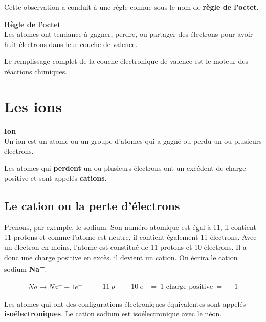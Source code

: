 \documentclass[
  11pt,
  french,
  a4paper,
  openany]{book}
\begin{document}
Cette observation a conduit à une règle connue sous le nom de \textbf{règle de l'octet}.

\begin{tcolorbox}
\textbf{Règle de l'octet}\\
Les atomes ont tendance à gagner, perdre, ou partager des électrons pour avoir huit électrons dans leur couche de valence.

\end{tcolorbox}

Le remplissage complet de la couche électronique de valence est le moteur des réactions chimiques.

\hypertarget{les-ions}{%
\section{Les ions}\label{les-ions}}

\begin{tcolorbox}
\textbf{Ion}\\
Un ion est un atome ou un groupe d'atomes qui a gagné ou perdu un ou plusieurs électrons.

\end{tcolorbox}

Les atomes qui \textbf{perdent} un ou plusieurs électrons ont un excédent de charge positive et sont appelés \textbf{cations}.

\hypertarget{le-cation-ou-la-perte-duxe9lectrons}{%
\subsection{Le cation ou la perte d'électrons}\label{le-cation-ou-la-perte-duxe9lectrons}}

Prenons, par exemple, le sodium. Son numéro atomique est égal à 11, il contient 11 protons et comme l'atome est neutre, il contient également 11 électrons. Avec un électron en moins, l'atome est constitué de 11 protons et 10 électrons. Il a donc une charge positive en excès. il devient un cation. On écrira le cation sodium \textbf{Na\textsuperscript{+}}.

\[ \begin{split}
        Na \rightarrow Na^+ + 1e^-
    \end{split}
    \qquad
    \begin{split}
        11\:p^{+}\:+\:10\:e^{-}\:=\:\text{1 charge positive}\:=\:+1
    \end{split} \]

Les atomes qui ont des configurations électroniques équivalentes sont appelés \textbf{isoélectroniques}. Le cation sodium est isoélectronique avec le néon.
\end{document}
